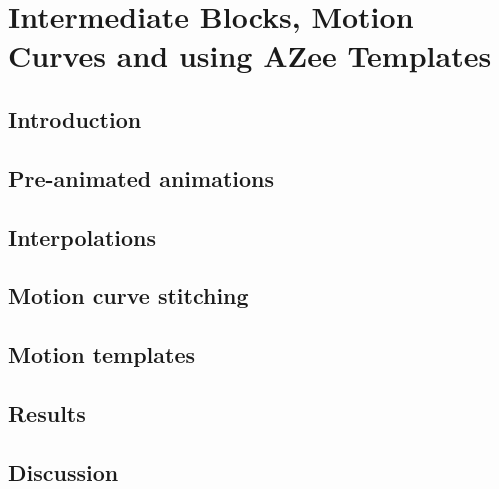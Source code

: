 \documentclass[../../main.tex]{subfiles}
\begin{document}
\chapter{Intermediate Blocks, Motion Curves and using AZee Templates}

\section{Introduction}

\section{Pre-animated animations}

\section{Interpolations}

\section{Motion curve stitching}

\section{Motion templates}

\section{Results}

\section{Discussion}
\end{document}
